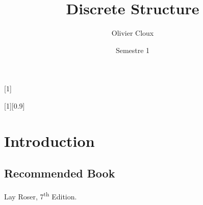 \documentclass[12pt,a4paper]{article}
\author{Olivier Cloux}
\title{Discrete Structure}
\date{Semestre 1}
\begin{document}
\newcommand{\combin}[2]{\begin{pmatrix}
#1\\
#2
\end{pmatrix}}
\newcommand{\somme}[3]{\ensuremath{\sum\limits_{#2}^{#1}\left(#3\right)}}
\newcommand{\produit}[3]{\ensuremath{\prod\limits_{#2}^{#1}\left(#3\right)}}
\newcommand{\limite}{\lim\limits_}
\newcommand{\evid}[1]{\textbf{\underline{#1}}}
\newcommand{\ninf}{\ensuremath{n \to \infty}}
\newcommand{\xinf}{\ensuremath{x \to \infty}}
\newcommand{\xo}{\ensuremath{x \to 0}}
\newcommand{\no}{\ensuremath{n \to 0}}
\newcommand{\xx}{\ensuremath{x \to x}}
\newcommand{\Xo}{\ensuremath{x_0}}
\newcommand{\E}{\ensuremath{\mathbb{E}}}
\newcommand{\A}{\ensuremath{\mathbf{A}}}
\newcommand{\R}{\ensuremath{\mathbb{R}}}
\newcommand{\N}{\ensuremath{\mathbb{N}}}
\newcommand{\Z}{\ensuremath{\mathbb{Z}}}
\newcommand{\Q}{\ensuremath{\mathbb{Q}}}
\newcommand{\rtor}{\ensuremath{\R \to \R}}
\newcommand{\ts}{\textsuperscript}
\newcommand{\bo}{\textbf}
\newcommand{\Ngo}{\ensuremath{\mathbb{N}_{\geq 0}}}
\newcommand{\Example}{\underline{Example}}
\newcommand{\Definition}{\underline{Definition}}
\newcommand{\f}{\ensuremath{f} }
\newcommand{\combi}[2]{\ensuremath{\begin{pmatrix} #1 \\ #2 \end{pmatrix}}}

[1]{
\begin{center}
\end{center}}

[1][0.9]{
\begin{center}
\end{center}
}


\maketitle
\tableofcontents
{}

\section{Introduction}
\subsection{Recommended Book} Lay Roser, 7\ts{th} Edition.\\
\end{document}
